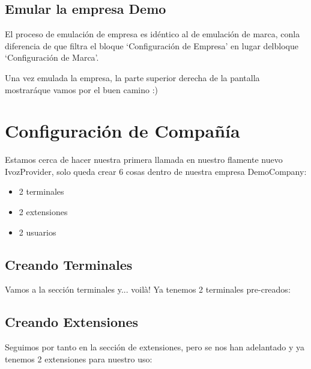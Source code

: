 \documentclass[letterpaper,10pt,spanish]{sphinxmanual}
\begin{document}
\subsection{Emular la empresa Demo}
\label{internal_calls/brand_portal:emulate-company}\label{internal_calls/brand_portal:emulate-demo-company}
El proceso de emulación de empresa es idéntico al de emulación de marca, conla diferencia de que filtra el bloque `Configuración de Empresa' en lugar delbloque `Configuración de Marca'.



Una vez emulada la empresa, la parte superior derecha de la pantalla mostraráque vamos por el buen camino :)


\section{Configuración de Compañía}
\label{internal_calls/company_portal:company-configuration}\label{internal_calls/company_portal::doc}
Estamos cerca de hacer nuestra primera llamada en nuestro flamente nuevo IvozProvider, solo queda crear 6 cosas dentro de nuestra empresa DemoCompany:
\begin{itemize}
\item {} 
2 terminales

\item {} 
2 extensiones

\item {} 
2 usuarios

\end{itemize}


\subsection{Creando Terminales}
\label{internal_calls/company_portal:creating-terminals}
Vamos a la sección terminales y... voilà! Ya tenemos 2 terminales pre-creados:

\noindent{}


\subsection{Creando Extensiones}
\label{internal_calls/company_portal:creating-extensions}
Seguimos por tanto en la sección de extensiones, pero se nos han adelantado y ya tenemos 2 extensiones para nuestro uso:
\end{document}
